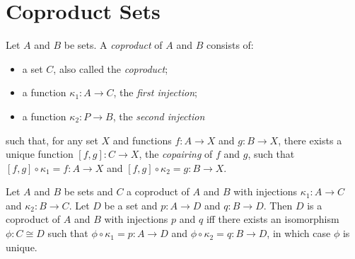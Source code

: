 \section{Coproduct Sets}

\begin{df}[Coproduct]
  Let $A$ and $B$ be sets. A \emph{coproduct} of $A$ and $B$ consists of:
  \begin{itemize}
    \item a set $C$, also called the \emph{coproduct};
    \item a function $\kappa_1 : A \rightarrow C$, the \emph{first injection};
    \item a function $\kappa_2 : P \rightarrow B$, the \emph{second injection}
  \end{itemize}
  such that, for any set $X$ and functions $f : A \rightarrow X$ and $g : B \rightarrow X$, there exists a unique function $[ f, g ] : C \rightarrow X$,
  the \emph{copairing} of $f$ and $g$, such that $[f,g] \circ \kappa_1 = f : A \rightarrow X$ and $[f,g] \circ \kappa_2 = g : B \rightarrow X$.
\end{df}

\begin{prop}
  Let $A$ and $B$ be sets and $C$ a coproduct of $A$ and $B$ with injections $\kappa_1 : A \rightarrow C$ and $\kappa_2 : B \rightarrow C$. Let $D$ be a set and $p : A \rightarrow D$
  and $q : B \rightarrow D$. Then $D$ is a coproduct of $A$ and $B$ with injections $p$ and $q$ iff there exists an isomorphism $\phi : C \cong D$ such that $\phi \circ \kappa_1 = p : A \rightarrow D$ and $\phi \circ \kappa_2 = q : B \rightarrow D$, in which case $\phi$ is unique.
\end{prop}

